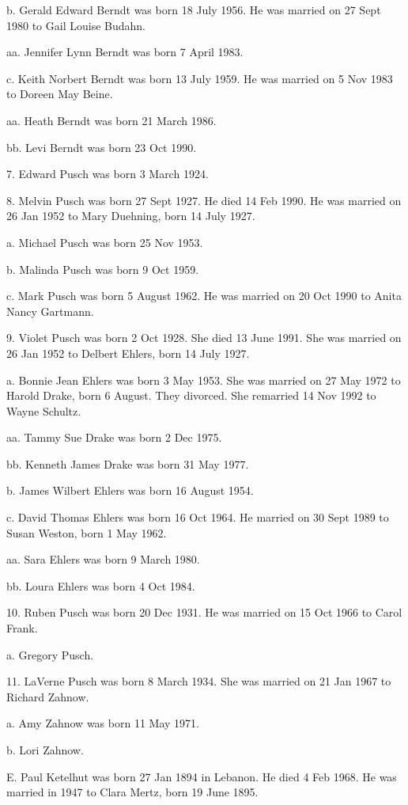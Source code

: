 \documentclass[a4paper]{article}
\begin{document}
b. Gerald Edward Berndt was born 18 July 1956.  He was married on 27 Sept 1980 to Gail Louise Budahn.

aa. Jennifer Lynn Berndt was born 7 April 1983.

c. Keith Norbert Berndt was born 13 July 1959.  He was married on 5 Nov 1983 to Doreen May Beine.

aa. Heath Berndt was born 21 March 1986.

bb. Levi Berndt was born 23 Oct 1990.

7. Edward Pusch was born 3 March 1924.

8. Melvin Pusch was born 27 Sept 1927.  He died 14 Feb 1990.  He was married on 26 Jan 1952 to Mary Duehning, born 14 July 1927.

a. Michael Pusch was born 25 Nov 1953.

b. Malinda Pusch was born 9 Oct 1959.

c. Mark Pusch was born 5 August 1962.  He was married on 20 Oct 1990 to Anita Nancy Gartmann.

9. Violet Pusch was born 2 Oct 1928.  She died 13 June 1991.  She was married on 26 Jan 1952 to Delbert Ehlers, born 14 July 1927.

a. Bonnie Jean Ehlers was born 3 May 1953.  She was married on 27 May 1972 to Harold Drake, born 6 August.  They divorced.  She remarried 14 Nov 1992 to Wayne Schultz.

aa. Tammy Sue Drake was born 2 Dec 1975.

bb. Kenneth James Drake was born 31 May 1977.

b. James Wilbert Ehlers was born 16 August 1954.

c. David Thomas Ehlers was born 16 Oct 1964.  He married on 30 Sept 1989 to Susan Weston, born 1 May 1962.

aa. Sara Ehlers was born 9 March 1980.

bb. Loura Ehlers was born 4 Oct 1984.

10. Ruben Pusch was born 20 Dec 1931.  He was married on 15 Oct 1966 to Carol Frank.

a. Gregory Pusch.

11. LaVerne Pusch  was born 8 March 1934.  She was married on 21 Jan 1967 to Richard Zahnow.  

a. Amy Zahnow was born 11 May 1971.

b. Lori Zahnow. 

E. Paul Ketelhut was born 27 Jan 1894 in Lebanon.  He died 4 Feb 1968.  He was married in 1947 to Clara Mertz, born 19 June 1895.  
\end{document}
